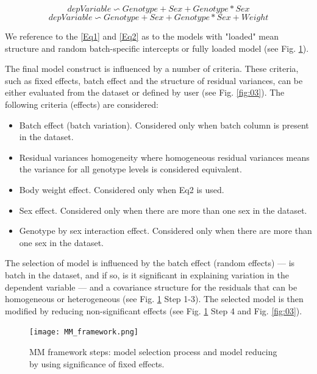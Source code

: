 \documentclass[12pt,a4paper]{article}
\begin{document}
\[
depVariable \backsim Genotype + Sex +
Genotype*Sex \tag{Eq1}\label{Eq1}
\]
\[
depVariable \backsim Genotype + Sex +
Genotype*Sex + Weight \tag{Eq2}\label{Eq2}
\]

We reference to the \ref{Eq1} and \ref{Eq2} as to the models with "loaded" mean structure and random batch-specific intercepts or fully loaded model (see Fig. \ref{fig:02}).

The final model construct is influenced by a number of criteria. 
These criteria, such as fixed effects, batch effect and the structure of residual variances, can be either evaluated from the dataset or defined by user (see Fig. \ref{fig:03}).
The following criteria (effects) are considered:
\begin{itemize}
\item Batch effect (batch variation). Considered only when batch column is present in the dataset. 
\item Residual variances homogeneity where homogeneous residual variances means the variance for all genotype levels is considered equivalent.
\item Body weight effect. Considered only when Eq2 is used.
\item Sex effect. Considered only when there are more than one sex in the dataset. 
\item Genotype by sex interaction effect. Considered only when there are more than one sex in the dataset. 
\end{itemize}

The selection of model is influenced by the batch effect (random effects) --- is batch in the dataset, and if so, is it significant in explaining variation in the dependent variable --- and a covariance structure for the residuals that can be homogeneous or heterogeneous (see Fig. \ref{fig:02} Step 1-3).
The selected model is then modified by reducing non-significant effects (see Fig. \ref{fig:02} Step 4 and Fig. \ref{fig:03}).

\begin{figure}[!tpb]%
\centerline{\texttt{[image: MM\_framework.png]}}
\caption{MM framework steps: model selection process and model reducing by using significance of fixed effects.}\label{fig:02}
\end{figure}
\end{document}
